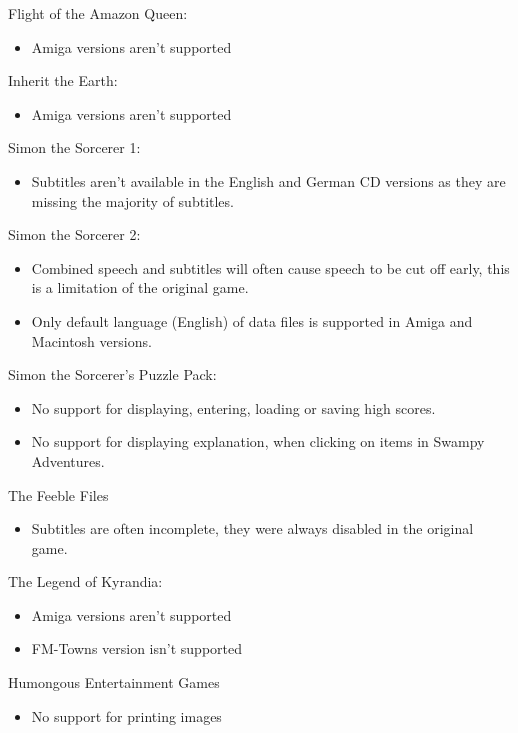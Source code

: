 Flight of the Amazon Queen:
  \begin{itemize}
  \item Amiga versions aren't supported
  \end{itemize}
Inherit the Earth:
  \begin{itemize}
  \item Amiga versions aren't supported
  \end{itemize}
Simon the Sorcerer 1:
  \begin{itemize}
  \item Subtitles aren't available in the English and German CD versions
            as they are missing the majority of subtitles.
  \end{itemize}
Simon the Sorcerer 2:
  \begin{itemize}
  \item Combined speech and subtitles will often cause speech to be
            cut off early, this is a limitation of the original game.
  \item Only default language (English) of data files is supported
            in Amiga and Macintosh versions.
  \end{itemize}
Simon the Sorcerer's Puzzle Pack:
  \begin{itemize}
  \item No support for displaying, entering, loading or saving high scores.
  \item No support for displaying explanation, when clicking on items in
            Swampy Adventures.
  \end{itemize}
The Feeble Files
  \begin{itemize}
  \item Subtitles are often incomplete, they were always disabled in the
            original game.
  \end{itemize}
The Legend of Kyrandia:
  \begin{itemize}
  \item Amiga versions aren't supported
  \item FM-Towns version isn't supported
  \end{itemize}
Humongous Entertainment Games
  \begin{itemize}
  \item No support for printing images
  \end{itemize}


